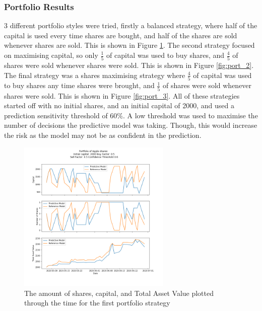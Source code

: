 \subsubsection{Portfolio Results}
3 different portfolio styles were tried, firstly a balanced strategy, where half of the capital is used every time shares are bought, and half of the shares are sold whenever shares are sold. This is shown in Figure \ref{fig:port_1}. The second strategy focused on maximising capital, so only \unboldmath$\frac{1}{5}$ of capital was used to buy shares, and $\frac{4}{5}$ of shares were sold whenever shares were sold. This is shown in Figure \ref{fig:port_2}. The final strategy was a shares maximising strategy where $\frac{4}{5}$ of capital was used to buy shares any time shares were brought, and $\frac{1}{5}$ of shares were sold whenever shares were sold. This is shown in Figure \ref{fig:port_3}. All of these strategies started off with no initial shares, and an initial capital of 2000, and used a prediction sensitivity threshold of 60\%. A low threshold was used to maximise the number of decisions the predictive model was taking. Though, this would increase the risk as the model may not be as confident in the prediction. 

\begin{figure}[H]
	\centering
	\includegraphics[width=0.65\textwidth]{images/portfolio_1.png}
	\caption{The amount of shares, capital, and Total Asset Value plotted through the time for the first portfolio strategy}
	\label{fig:port_1}
\end{figure}

